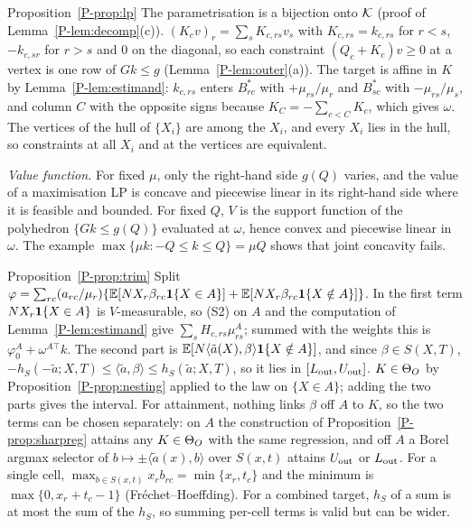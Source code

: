 \begin{proofof}{Proposition~\ref{P-prop:lp}}
The parametrisation is a bijection onto $\mathcal K$ (proof of
Lemma~\ref{P-lem:decomp}(c)). $(K_cv)_r=\sum_sK_{c,rs}v_s$ with $K_{c,rs}=k_{c,rs}$ for
$r<s$, $-k_{c,sr}$ for $r>s$ and $0$ on the diagonal, so each constraint
$(Q_c+K_c)v\ge0$ at a vertex is one row of $Gk\le g$ (Lemma~\ref{P-lem:outer}(a)).
The target is affine in $K$ by Lemma~\ref{P-lem:estimand}: $k_{c,rs}$ enters
$B^*_{rc}$ with $+\mu_{rs}/\mu_r$ and $B^*_{sc}$ with $-\mu_{rs}/\mu_s$, and column $C$
with the opposite signs because $K_C=-\sum_{c<C}K_c$, which gives $\omega$. The
vertices of the hull of $\{X_i\}$ are among the $X_i$, and every $X_i$ lies in the
hull, so constraints at all $X_i$ and at the vertices are equivalent.
\end{proofof}

\emph{Value function.} For fixed $\mu$, only the right-hand side $g(Q)$ varies, and
the value of a maximisation LP is concave and piecewise linear in its right-hand side
where it is feasible and bounded. For fixed $Q$, $V$ is the support function of the
polyhedron $\{Gk\le g(Q)\}$ evaluated at $\omega$, hence convex and piecewise linear
in $\omega$. The example $\max\{\mu k:-Q\le k\le Q\}=\mu Q$ shows that joint concavity
fails.

\begin{proofof}{Proposition~\ref{P-prop:trim}}
Split $\varphi=\sum_{rc}(a_{rc}/\mu_r)\{\mathbb E[NX_r\beta_{rc}\mathbf 1\{X\in A\}]+\mathbb E[NX_r\beta_{rc}\mathbf 1\{X\notin A\}]\}$.
In the first term $NX_r\mathbf 1\{X\in A\}$ is $V$-measurable, so (S2) on $A$ and the
computation of Lemma~\ref{P-lem:estimand} give $\sum_sH_{c,rs}\mu^A_{rs}$; summed with
the weights this is $\varphi^A_0+\omega^{A\top}k$. The second part is
$\mathbb E[N\langle\tilde a(X),\beta\rangle\mathbf 1\{X\notin A\}]$, and since $\beta\in S(X,T)$,
$-h_S(-\tilde a;X,T)\le\langle\tilde a,\beta\rangle\le h_S(\tilde a;X,T)$, so it lies in
$[L_{\rm out},U_{\rm out}]$. $K\in\Theta_O$ by Proposition~\ref{P-prop:nesting} applied to
the law on $\{X\in A\}$; adding the two parts gives the interval. For attainment,
nothing links $\beta$ off $A$ to $K$, so the two terms can be chosen separately: on $A$
the construction of Proposition~\ref{P-prop:sharpreg} attains any $K\in\Theta_O$ with the
same regression, and off $A$ a Borel argmax selector of $b\mapsto\pm\langle\tilde
a(x),b\rangle$ over $S(x,t)$ attains $U_{\rm out}$ or $L_{\rm out}$. For a single cell,
$\max_{b\in S(x,t)}x_rb_{rc}=\min\{x_r,t_c\}$ and the minimum is
$\max\{0,x_r+t_c-1\}$ (Fréchet--Hoeffding). For a combined target, $h_S$ of a sum is at
most the sum of the $h_S$, so summing per-cell terms is valid but can be wider.
\end{proofof}

